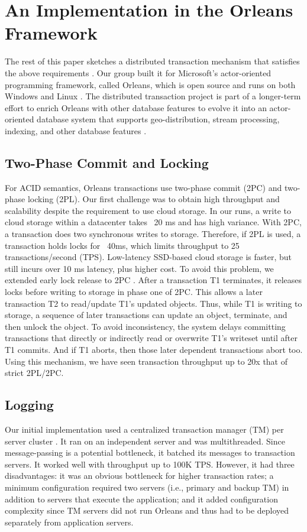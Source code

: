 \documentclass[11pt]{article}
\begin{document}
\section{An Implementation in the Orleans Framework}
The rest of this paper sketches a distributed transaction mechanism that satisfies the above requirements \cite{9}. Our group built it for Microsoft's actor-oriented programming framework, called Orleans, which is open source and runs on both Windows and Linux \cite{16}. The distributed transaction project is part of a longer-term effort to enrich Orleans with other database features to evolve it into an actor-oriented database system that supports geo-distribution, stream processing, indexing, and other database features \cite{3}. 
\subsection{Two-Phase Commit and Locking}
For ACID semantics, Orleans transactions use two-phase commit (2PC) and two-phase locking (2PL). Our first challenge was to obtain high throughput and scalability despite the requirement to use cloud storage. In our runs, a write to cloud storage within a datacenter takes ~20 ms and has high variance. With 2PC, a transaction does two synchronous writes to storage. Therefore, if 2PL is used, a transaction holds locks for ~40ms, which limits throughput to 25 transactions/second (TPS). Low-latency SSD-based cloud storage is faster, but still incurs over 10 ms latency, plus higher cost. 
To avoid this problem, we extended early lock release to 2PC \cite{1,7,10,13,14,15}. After a transaction T1 terminates, it releases locks before writing to storage in phase one of 2PC. This allows a later transaction T2 to read/update T1's updated objects. Thus, while T1 is writing to storage, a sequence of later transactions can update an object, terminate, and then unlock the object. To avoid inconsistency, the system delays committing transactions that directly or indirectly read or overwrite T1's writeset until after T1 commits. And if T1 aborts, then those later dependent transactions abort too. Using this mechanism, we have seen transaction throughput up to 20x that of strict 2PL/2PC. 
\subsection{Logging}
Our initial implementation used a centralized transaction manager (TM) per server cluster \cite{9}. It ran on an independent server and was multithreaded. Since message-passing is a potential bottleneck, it batched its messages to transaction servers. It worked well with throughput up to 100K TPS. However, it had three disadvantages: it was an obvious bottleneck for higher transaction rates; a minimum configuration required two servers (i.e., primary and backup TM) in addition to servers that execute the application; and it added configuration complexity since TM servers did not run Orleans and thus had to be deployed separately from application servers.  
\end{document}

